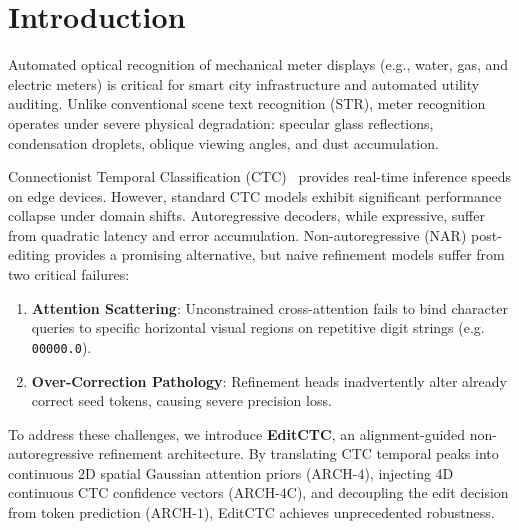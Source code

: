 \section{Introduction}
\label{sec:intro}
Automated optical recognition of mechanical meter displays (e.g., water, gas, and electric meters) is critical for smart city infrastructure and automated utility auditing. Unlike conventional scene text recognition (STR), meter recognition operates under severe physical degradation: specular glass reflections, condensation droplets, oblique viewing angles, and dust accumulation.

Connectionist Temporal Classification (CTC)~\cite{graves2006connectionist} provides real-time inference speeds on edge devices. However, standard CTC models exhibit significant performance collapse under domain shifts. Autoregressive decoders, while expressive, suffer from quadratic latency and error accumulation. Non-autoregressive (NAR) post-editing provides a promising alternative, but naive refinement models suffer from two critical failures:
\begin{enumerate}
    \item \textbf{Attention Scattering}: Unconstrained cross-attention fails to bind character queries to specific horizontal visual regions on repetitive digit strings (e.g. \texttt{00000.0}).
    \item \textbf{Over-Correction Pathology}: Refinement heads inadvertently alter already correct seed tokens, causing severe precision loss.
\end{enumerate}

To address these challenges, we introduce \textbf{EditCTC}, an alignment-guided non-autoregressive refinement architecture. By translating CTC temporal peaks into continuous 2D spatial Gaussian attention priors ($\text{ARCH-4}$), injecting 4D continuous CTC confidence vectors ($\text{ARCH-4C}$), and decoupling the edit decision from token prediction ($\text{ARCH-1}$), EditCTC achieves unprecedented robustness.
